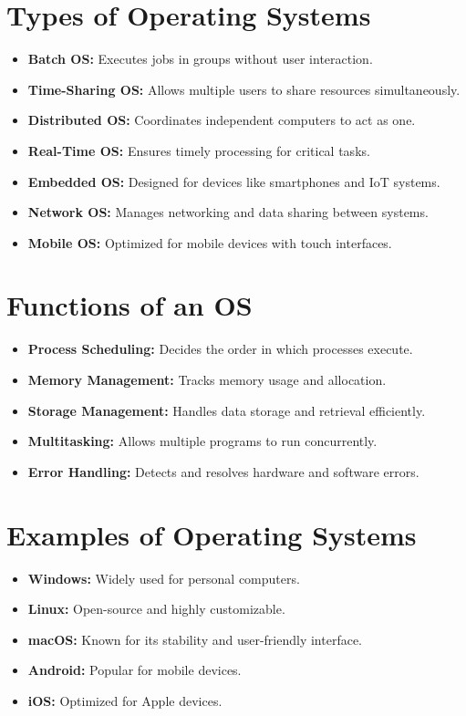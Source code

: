\documentclass[openany]{book} %
\begin{document}
\section{Types of Operating Systems}
\begin{itemize}
    \item \textbf{Batch OS:} Executes jobs in groups without user interaction.
    \item \textbf{Time-Sharing OS:} Allows multiple users to share resources simultaneously.
    \item \textbf{Distributed OS:} Coordinates independent computers to act as one.
    \item \textbf{Real-Time OS:} Ensures timely processing for critical tasks.
    \item \textbf{Embedded OS:} Designed for devices like smartphones and IoT systems.
    \item \textbf{Network OS:} Manages networking and data sharing between systems.
    \item \textbf{Mobile OS:} Optimized for mobile devices with touch interfaces.
\end{itemize}

\section{Functions of an OS}
\begin{itemize}
    \item \textbf{Process Scheduling:} Decides the order in which processes execute.
    \item \textbf{Memory Management:} Tracks memory usage and allocation.
    \item \textbf{Storage Management:} Handles data storage and retrieval efficiently.
    \item \textbf{Multitasking:} Allows multiple programs to run concurrently.
    \item \textbf{Error Handling:} Detects and resolves hardware and software errors.
\end{itemize}

\section{Examples of Operating Systems}
\begin{itemize}
    \item \textbf{Windows:} Widely used for personal computers.
    \item \textbf{Linux:} Open-source and highly customizable.
    \item \textbf{macOS:} Known for its stability and user-friendly interface.
    \item \textbf{Android:} Popular for mobile devices.
    \item \textbf{iOS:} Optimized for Apple devices.
\end{itemize}
\end{document}
